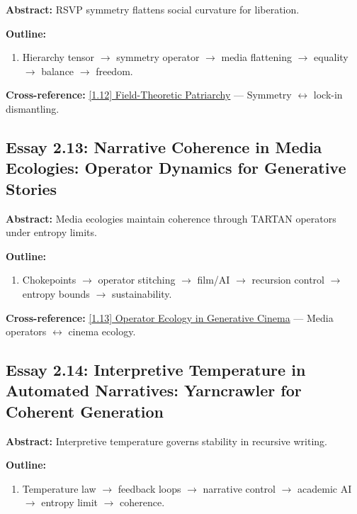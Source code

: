 \documentclass[12pt,a4paper]{article}
\begin{document}
\textbf{Abstract:} RSVP symmetry flattens social curvature for liberation.

\textbf{Outline:}
\begin{enumerate}
\item Hierarchy tensor $\to$ symmetry operator $\to$ media flattening $\to$ equality $\to$ balance $\to$ freedom.
\end{enumerate}

\textbf{Cross-reference:} \hyperref[sec:essay1-12]{[1.12] Field-Theoretic Patriarchy} --- Symmetry $\leftrightarrow$ lock-in dismantling.

\subsection{Essay 2.13: Narrative Coherence in Media Ecologies: Operator Dynamics for Generative Stories}
\label{sec:essay2-13}

\textbf{Abstract:} Media ecologies maintain coherence through TARTAN operators under entropy limits.

\textbf{Outline:}
\begin{enumerate}
\item Chokepoints $\to$ operator stitching $\to$ film/AI $\to$ recursion control $\to$ entropy bounds $\to$ sustainability.
\end{enumerate}

\textbf{Cross-reference:} \hyperref[sec:essay1-13]{[1.13] Operator Ecology in Generative Cinema} --- Media operators $\leftrightarrow$ cinema ecology.

\subsection{Essay 2.14: Interpretive Temperature in Automated Narratives: Yarncrawler for Coherent Generation}
\label{sec:essay2-14}

\textbf{Abstract:} Interpretive temperature governs stability in recursive writing.

\textbf{Outline:}
\begin{enumerate}
\item Temperature law $\to$ feedback loops $\to$ narrative control $\to$ academic AI $\to$ entropy limit $\to$ coherence.
\end{enumerate}
\end{document}
